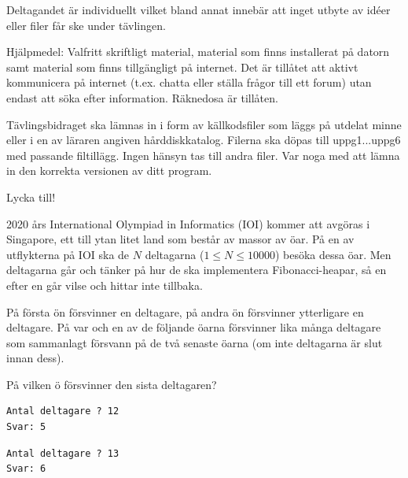 \begin{lista}
\item Deltagandet är individuellt vilket bland annat innebär att inget utbyte av idéer eller 
filer får ske under tävlingen.  
\item Hjälpmedel: Valfritt skriftligt material, material som finns installerat på datorn samt material som finns tillgängligt på internet. Det är  tillåtet att aktivt kommunicera på internet (t.ex. chatta eller ställa frågor till ett forum) utan endast att söka efter information. Räknedosa är tillåten.
\item Tävlingsbidraget ska lämnas in i form av källkodsfiler som läggs på utdelat 
minne eller i en av läraren angiven hårddiskkatalog. Filerna ska döpas till 
uppg1...uppg6 med passande filtillägg. Ingen hänsyn tas till andra filer. Var noga 
med att lämna in den korrekta versionen av ditt program.  
\end{lista}

\begin{center}
\Large Lycka till!
\end{center}
%

\newpage




2020 års International Olympiad in Informatics (IOI) kommer att avgöras i Singapore, ett till ytan litet land som består av massor av öar. På en av utflykterna på IOI ska de $N$ deltagarna ($1\le N \le 10000$) besöka dessa öar. Men deltagarna går och tänker på hur de ska implementera Fibonacci-heapar, så en efter en går vilse och hittar inte tillbaka.

På första ön försvinner en deltagare, på andra ön försvinner ytterligare en deltagare. På var och en av de följande öarna försvinner lika många deltagare som sammanlagt försvann på de två senaste öarna (om inte deltagarna är slut innan dess).

På vilken ö försvinner den sista deltagaren?


\begin{verbatim}
Antal deltagare ? 12
Svar: 5
\end{verbatim}


\begin{verbatim}
Antal deltagare ? 13
Svar: 6
\end{verbatim}

